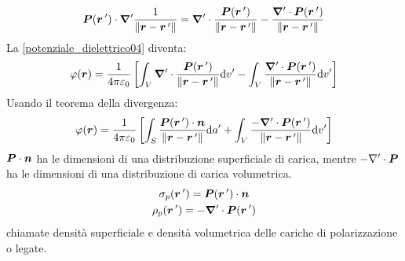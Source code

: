 \begin{equation}
\boldsymbol{P}(\boldsymbol{r}\,')\cdot\boldsymbol{\nabla}'\frac{1}{\left\lVert\boldsymbol{r}-\boldsymbol{r}\,'\right\rVert}=\boldsymbol{\nabla}'\cdot\frac{\boldsymbol{P}(\boldsymbol{r}\,')}{\left\lVert\boldsymbol{r}-\boldsymbol{r}\,'\right\rVert}-\frac{\boldsymbol{\nabla}'\cdot\boldsymbol{P}(\boldsymbol{r}\,')}{\left\lVert\boldsymbol{r}-\boldsymbol{r}\,'\right\rVert}
\end{equation}
La \eqref{potenziale_dielettrico04} diventa:
\begin{equation}
\varphi(\boldsymbol{r})=\frac{1}{4\pi\varepsilon_0}\left[\int_V\boldsymbol{\nabla}'\cdot\frac{\boldsymbol{P}(\boldsymbol{r}\,')}{\left\lVert\boldsymbol{r}-\boldsymbol{r}\,'\right\rVert}\mathrm{d} v'-\int_V\frac{\boldsymbol{\nabla}'\cdot\boldsymbol{P}(\boldsymbol{r}\,')}{\left\lVert\boldsymbol{r}-\boldsymbol{r}\,'\right\rVert}\mathrm{d} v'\right]
\end{equation}
Usando il teorema della divergenza:
\begin{equation}
\varphi(\boldsymbol{r})=\frac{1}{4\pi\varepsilon_0}\left[\int_S\frac{\boldsymbol{P}(\boldsymbol{r}\,')\cdot \boldsymbol{n}}{\left\lVert\boldsymbol{r}-\boldsymbol{r}\,'\right\rVert}\mathrm{d} a'+\int_V\frac{-\boldsymbol{\nabla}'\cdot\boldsymbol{P}(\boldsymbol{r}\,')}{\left\lVert\boldsymbol{r}-\boldsymbol{r}\,'\right\rVert}\mathrm{d} v'\right]
\end{equation}
$\boldsymbol{P}\cdot\boldsymbol{n}$ ha le dimensioni di una distribuzione superficiale di carica, mentre $-\nabla'\cdot\boldsymbol{P}$ ha le dimensioni di una distribuzione di carica volumetrica.
\begin{subequations}
\begin{gather}
\sigma_p(\boldsymbol{r}\,')=\boldsymbol{P}(\boldsymbol{r}\,')\cdot \boldsymbol{n}\\
\rho_p(\boldsymbol{r}\,')=-\boldsymbol{\nabla}'\cdot\boldsymbol{P}(\boldsymbol{r}\,')
\end{gather}
\end{subequations}
chiamate densità superficiale e densità volumetrica delle cariche di polarizzazione o legate.

